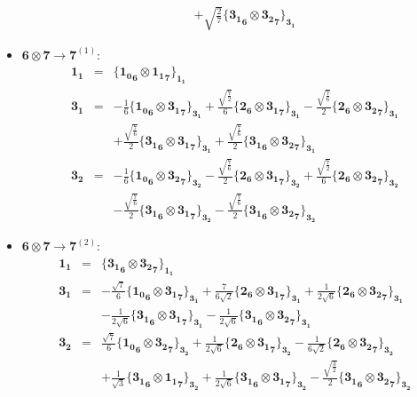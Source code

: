 \documentclass[english]{article}
\newcommand{\subcg}[3]{\big\{ {#1}\otimes{#2}\big\}^{}_{#3}}
\newcommand{\rep}[1]{\mathbf{#1}}
\begin{document}
\begin{itemize}
\begin{eqnarray*}
 & & +\sqrt{\frac{2}{7}}\subcg{\rep{3_1}_{\rep{6}}}{\rep{3_2}_{\rep{7}}}{\rep{3_1}}
\end{eqnarray*}
\item $\rep{6}\otimes\rep{7}\to\rep{7}^{(1)}$:
\begin{eqnarray*}
\rep{1_1} &=& \subcg{\rep{1_0}_{\rep{6}}}{\rep{1_1}_{\rep{7}}}{\rep{1_1}}
\\
\rep{3_1} &=& -\frac{1}{6}\subcg{\rep{1_0}_{\rep{6}}}{\rep{3_1}_{\rep{7}}}{\rep{3_1}}+\frac{\sqrt{\frac{7}{2}}}{6}\subcg{\rep{2}_{\rep{6}}}{\rep{3_1}_{\rep{7}}}{\rep{3_1}}-\frac{\sqrt{\frac{7}{6}}}{2}\subcg{\rep{2}_{\rep{6}}}{\rep{3_2}_{\rep{7}}}{\rep{3_1}} \\ 
 & & +\frac{\sqrt{\frac{7}{6}}}{2}\subcg{\rep{3_1}_{\rep{6}}}{\rep{3_1}_{\rep{7}}}{\rep{3_1}}+\frac{\sqrt{\frac{7}{6}}}{2}\subcg{\rep{3_1}_{\rep{6}}}{\rep{3_2}_{\rep{7}}}{\rep{3_1}}
\\
\rep{3_2} &=& -\frac{1}{6}\subcg{\rep{1_0}_{\rep{6}}}{\rep{3_2}_{\rep{7}}}{\rep{3_2}}-\frac{\sqrt{\frac{7}{6}}}{2}\subcg{\rep{2}_{\rep{6}}}{\rep{3_1}_{\rep{7}}}{\rep{3_2}}+\frac{\sqrt{\frac{7}{2}}}{6}\subcg{\rep{2}_{\rep{6}}}{\rep{3_2}_{\rep{7}}}{\rep{3_2}} \\ 
 & & -\frac{\sqrt{\frac{7}{6}}}{2}\subcg{\rep{3_1}_{\rep{6}}}{\rep{3_1}_{\rep{7}}}{\rep{3_2}}-\frac{\sqrt{\frac{7}{6}}}{2}\subcg{\rep{3_1}_{\rep{6}}}{\rep{3_2}_{\rep{7}}}{\rep{3_2}}
\end{eqnarray*}
\item $\rep{6}\otimes\rep{7}\to\rep{7}^{(2)}$:
\begin{eqnarray*}
\rep{1_1} &=& \subcg{\rep{3_1}_{\rep{6}}}{\rep{3_2}_{\rep{7}}}{\rep{1_1}}
\\
\rep{3_1} &=& -\frac{\sqrt{7}}{6}\subcg{\rep{1_0}_{\rep{6}}}{\rep{3_1}_{\rep{7}}}{\rep{3_1}}+\frac{7}{6 \sqrt{2}}\subcg{\rep{2}_{\rep{6}}}{\rep{3_1}_{\rep{7}}}{\rep{3_1}}+\frac{1}{2 \sqrt{6}}\subcg{\rep{2}_{\rep{6}}}{\rep{3_2}_{\rep{7}}}{\rep{3_1}} \\ 
 & & -\frac{1}{2 \sqrt{6}}\subcg{\rep{3_1}_{\rep{6}}}{\rep{3_1}_{\rep{7}}}{\rep{3_1}}-\frac{1}{2 \sqrt{6}}\subcg{\rep{3_1}_{\rep{6}}}{\rep{3_2}_{\rep{7}}}{\rep{3_1}}
\\
\rep{3_2} &=& \frac{\sqrt{7}}{6}\subcg{\rep{1_0}_{\rep{6}}}{\rep{3_2}_{\rep{7}}}{\rep{3_2}}+\frac{1}{2 \sqrt{6}}\subcg{\rep{2}_{\rep{6}}}{\rep{3_1}_{\rep{7}}}{\rep{3_2}}-\frac{1}{6 \sqrt{2}}\subcg{\rep{2}_{\rep{6}}}{\rep{3_2}_{\rep{7}}}{\rep{3_2}} \\ 
 & & +\frac{1}{\sqrt{3}}\subcg{\rep{3_1}_{\rep{6}}}{\rep{1_1}_{\rep{7}}}{\rep{3_2}}+\frac{1}{2 \sqrt{6}}\subcg{\rep{3_1}_{\rep{6}}}{\rep{3_1}_{\rep{7}}}{\rep{3_2}}-\frac{\sqrt{\frac{3}{2}}}{2}\subcg{\rep{3_1}_{\rep{6}}}{\rep{3_2}_{\rep{7}}}{\rep{3_2}}

\end{eqnarray*}
\end{itemize}
\end{document}
